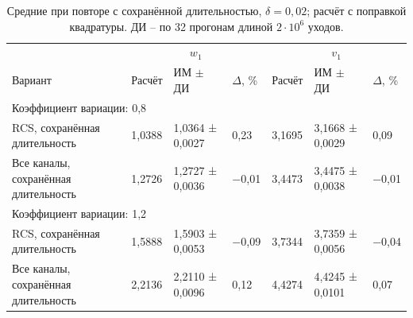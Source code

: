 \documentclass[a4paper,12pt]{article}
\begin{document}
\begin{table}[!htbp]
\centering\small\setlength{\tabcolsep}{2pt}
\begin{tabular}{@{}p{4.16cm}p{1.61cm}p{2.83cm}p{1.28cm}p{1.61cm}p{2.83cm}p{1.28cm}@{}}
\toprule
 & \multicolumn{3}{c}{$w_1$} & \multicolumn{3}{c}{$v_1$} \\
Вариант & Расчёт & ИМ $\pm$ ДИ & $\Delta$, \% & Расчёт & ИМ $\pm$ ДИ & $\Delta$, \% \\
\midrule
\multicolumn{7}{l}{Коэффициент вариации: 0,8} \\
RCS, сохранённая длительность & 1,0388 & 1,0364 ± 0,0027 & 0,23 & 3,1695 & 3,1668 ± 0,0029 & 0,09 \\
Все каналы, сохранённая длительность & 1,2726 & 1,2727 ± 0,0036 & −0,01 & 3,4473 & 3,4475 ± 0,0038 & −0,01 \\
\multicolumn{7}{l}{Коэффициент вариации: 1,2} \\
RCS, сохранённая длительность & 1,5888 & 1,5903 ± 0,0053 & −0,09 & 3,7344 & 3,7359 ± 0,0056 & −0,04 \\
Все каналы, сохранённая длительность & 2,2136 & 2,2110 ± 0,0096 & 0,12 & 4,4274 & 4,4245 ± 0,0101 & 0,07 \\
\bottomrule
\end{tabular}
\caption{Средние при повторе с сохранённой длительностью, $\delta=0{,}02$; расчёт с поправкой квадратуры. ДИ -- по 32 прогонам длиной $2\cdot10^6$ уходов.}
\label{tab:results_fixed}
\end{table}
\end{document}
